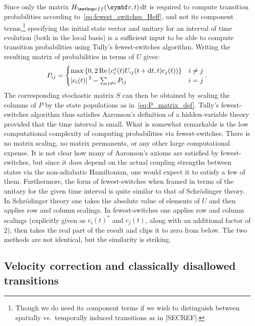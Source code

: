 Since only the matrix $H_\up{eff}(\vec r, t)\,\dd t$ is required to compute transition probabilities according to~\eqref{eq:fewest_switches_Heff}, and not its component terms,\footnote{Though we do need its component terms if we wish to distinguish between spatially vs.\ temporally induced transitions as in [SECREF].} specifying the initial state vector and unitary for an interval of time evolution (both in the local basis) is a sufficient input to be able to compute transition probabilities using Tully's fewest-switches algorithm. Writing the resulting matrix of probabilities in terms of $U$ gives:
\begin{align}
P_{ij} = \begin{cases}
\max\left\{0, 2\re\left(c_i^*(t)U_{ij}(t + \dd t, t)c_j(t)\right)\right\} & i \neq j\\
\abs{c_i(t)}^2 - \sum_{j\neq i} P_{ij} & i = j
\end{cases}.
\end{align}
The corresponding stochastic matrix $S$ can then be obtained by scaling the columns of $P$ by the state populations as in~\eqref{eq:P_matrix_def}. Tully's fewest-switches algorithm thus satisfies Aaronson's definition of a hidden-variable theory provided that the time interval is small. What is somewhat remarkable is the low computational complexity of computing probabilities via fewest-switches. There is no matrix scaling, no matrix permanents, or any other large computational expense. It is not clear how many of Aaronson's axioms are satisfied by fewest-switches, but since it does depend on the actual coupling strengths between states via the non-adiabatic Hamiltonian, one would expect it to satisfy a few of them. Furthermore, the form of fewest-switches when framed in terms of the unitary for the given time interval is quite similar to that of Schr\"odinger theory. In Schr\"odinger theory one takes the absolute value of elements of $U$ and then applies row and column scalings. In fewest-switches one applies row and column scalings (explicitly given as $c_i(t)^*$ and $c_j(t)$, along with an additional factor of $2$), then takes the real part of the result and clips it to zero from below. The two methods are not identical, but the similarity is striking.

\subsection{Velocity correction and classically disallowed transitions}\label{sec:velocity_correction}

